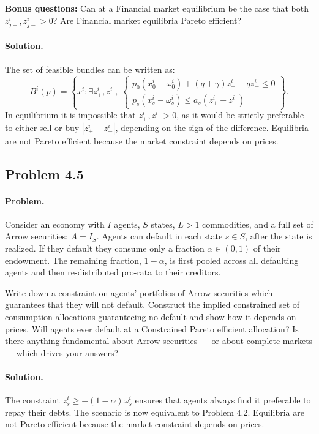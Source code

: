 \textbf{Bonus questions:} Can at a Financial market equilibrium be the case that both $z_{j+}^i, z_{j-}^i > 0$? Are Financial market equilibria Pareto efficient?

\paragraph{Solution.}
The set of feasible bundles can be written as:
\[
B^i(p) = \left\{ x^i : \exists z_+^i, z_-^i, \
\begin{cases}
p_0 (x_0^i - \omega_0^i) + (q + \gamma) z_+^i - q z_-^i \leq 0 \\
p_s (x_s^i - \omega_s^i) \leq a_s (z_+^i - z_-^i)
\end{cases} \right\}.
\]
In equilibrium it is impossible that $z_+^i, z_-^i > 0$, as it would be strictly preferable to either sell or buy $|z_+^i - z_-^i|$, depending on the sign of the difference. Equilibria are not Pareto efficient because the market constraint depends on prices.

\subsection{Problem 4.5}
\paragraph{Problem.} Consider an economy with $I$ agents, $S$ states, $L > 1$ commodities, and a full set of Arrow securities: $A = I_S$. Agents can default in each state $s \in S$, after the state is realized. If they default they consume only a fraction $\alpha \in (0,1)$ of their endowment. The remaining fraction, $1 - \alpha$, is first pooled across all defaulting agents and then re-distributed pro-rata to their creditors.

Write down a constraint on agents' portfolios of Arrow securities which guarantees that they will not default. Construct the implied constrained set of consumption allocations guaranteeing no default and show how it depends on prices. Will agents ever default at a Constrained Pareto efficient allocation? Is there anything fundamental about Arrow securities --- or about complete markets --- which drives your answers?

\paragraph{Solution.}
The constraint $z_s^i \geq -(1 - \alpha) \omega_s^i$ ensures that agents always find it preferable to repay their debts. The scenario is now equivalent to Problem 4.2. Equilibria are not Pareto efficient because the market constraint depends on prices.

